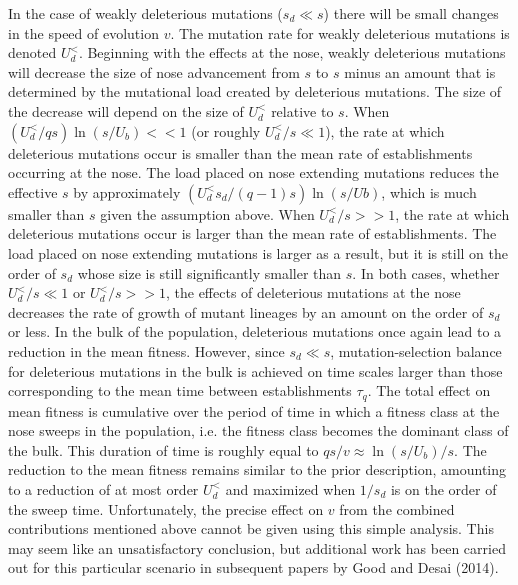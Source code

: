 \documentclass[12pt, one column]{article}
\begin{document}
In the case of weakly deleterious mutations ($s_d \ll s$) there will be small changes in the speed of evolution $v$.  The mutation rate for weakly deleterious mutations is denoted $U_d^{<}$.  Beginning with the effects at the nose, weakly deleterious mutations will decrease the size of nose advancement from $s$ to $s$ minus an amount that is determined by the mutational load created by deleterious mutations.  The size of the decrease will depend on the size of $U_d^{<}$ relative to $s$.  When $(U_d^{<} / qs)\ln(s/U_b) <<1$ (or roughly $U_d^{<}/s \ll 1$), the rate at which deleterious mutations occur is smaller than the mean rate of establishments occurring at the nose.  The load placed on nose extending mutations reduces the effective $s$ by approximately $(U_d^{<} s_d /(q-1)s)\ln(s/Ub)$, which is much smaller than $s$ given the assumption above.  When $U_d^{<} / s >> 1 $, the rate at which deleterious mutations occur is larger than the mean rate of establishments.  The load placed on nose extending mutations is larger as a result, but it is still on the order of $s_d$ whose size is still significantly smaller than $s$.  In both cases, whether $U_d^{<}/s \ll 1$ or $U_d^{<}/s >> 1$, the effects of deleterious mutations at the nose decreases the rate of growth of mutant lineages by an amount on the order of $s_d$ or less.  In the bulk of the population, deleterious mutations once again lead to a reduction in the mean fitness.  However, since $s_d \ll s$, mutation-selection balance for deleterious mutations in the bulk is achieved on time scales larger than those corresponding to the mean time between establishments $\tau_q$.  The total effect on mean fitness is cumulative over the period of time in which a fitness class at the nose sweeps in the population, i.e. the fitness class becomes the dominant class of the bulk.  This duration of time is roughly equal to $qs/v \approx \ln(s/U_b)/s$.  The reduction to the mean fitness remains similar to the prior description, amounting to a reduction of at most order $U_d^{<}$ and maximized when $1/s_d$ is on the order of the sweep time.  Unfortunately, the precise effect on $v$ from the combined contributions mentioned above cannot be given using this simple analysis.  This may seem like an unsatisfactory conclusion, but additional work has been carried out for this particular scenario in subsequent papers by Good and Desai (2014).
\end{document}
